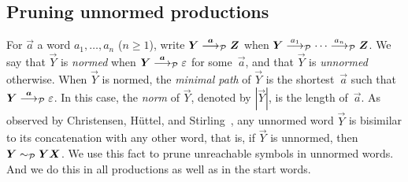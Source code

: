\subsection{Pruning unnormed productions}

For $\vec a$ a word $a_1,\dots, a_n$ ($n\ge1$), write
$\vec Y \LTSderivesP[\vec a] \vec Z$ when
$\vec Y \LTSderivesP[a_1] \cdots \LTSderivesP[a_n] \vec Z$.
%
We say that $\vec Y$ is \emph{normed} when
$\vec Y \LTSderivesP[\vec a] \varepsilon$ for some~$\vec a$, and that
$\vec Y$ is \emph{unnormed} otherwise.
%
When $\vec Y$ is normed, the \emph{minimal path} of $\vec Y$ is the
shortest~$\vec a$ such that $\vec Y \LTSderivesP[\vec a]
\varepsilon$.
%
In this case, the \emph{norm} of $\vec Y$, denoted by $|\vec Y|$, is
the length of~$\vec a$.
%
%
As observed by Christensen, H\"uttel, and
Stirling~\cite{DBLP:journals/iandc/ChristensenHS95}, any unnormed word
$\vec Y$ is bisimilar to its concatenation with any other word, that
is, if $\vec Y$ is unnormed, then $\vec Y \ProdEquiv \vec Y \vec X$.
We use this fact to prune unreachable symbols in unnormed words. And
we do this in all productions as well as in the start words.




